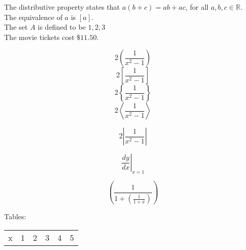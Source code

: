 \documentclass[11pt]{article}
\begin{document}
The distributive property states that $a(b+c) = ab + ac$, for all $a,b,c \in \mathbb{R}$. \\ [6pt]
The equivalence of $a$ is $[a]$. \\ [6pt]
The set $A$ is defined to be ${1, 2, 3}$ \\ [6pt]
The movie tickets cost $\$11.50$.

$$2\left(\frac{1}{{x^2}-1}\right)$$
$$2\left[\frac{1}{{x^2}-1}\right]$$
$$2\left\{\frac{1}{{x^2}-1}\right\}$$
$$2\left    \langle  \frac{1}{{x^2}-1}\right  \rangle     $$

$$2\left   |  \frac{1}{{x^2}-1}\right  |     $$

$$ \left. \frac{dy}{dx} \right| _{x=1}   $$

$$  \left(\frac{1}{1+\left( \frac{1}{1+x} \right)} \right)  $$



Tables:\\

\begin{tabular}{|c|c|c|c|c|c|}

x & 1 & 2 & 3 & 4 & 5

\end{tabular}
\end{document}

